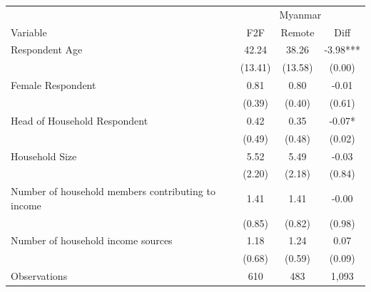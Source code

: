 \begin{tabular}{l*{3}c}
\hline\hline
 & \multicolumn{3}{c}{Myanmar}\\ 
Variable & F2F & Remote & Diff \\
\hline
Respondent Age&42.24&38.26&-3.98***\\
&(13.41)&(13.58)&(0.00)\\
Female Respondent&0.81&0.80&-0.01\\
&(0.39)&(0.40)&(0.61)\\
Head of Household Respondent&0.42&0.35&-0.07*\\
&(0.49)&(0.48)&(0.02)\\
Household Size&5.52&5.49&-0.03\\
&(2.20)&(2.18)&(0.84)\\
Number of household members contributing to income&1.41&1.41&-0.00\\
&(0.85)&(0.82)&(0.98)\\
Number of household income sources&1.18&1.24&0.07\\
&(0.68)&(0.59)&(0.09)\\
\hline
Observations & 610 & 483 & 1,093 \\
\hline\hline
\end{tabular}
